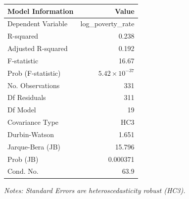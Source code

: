 \begin{table}[h]
\vspace{0.3cm}

\begin{tabular}{|l|r|}
\hline
\textbf{Model Information} & \textbf{Value} \\
\hline
Dependent Variable & log\_poverty\_rate \\
R-squared & 0.238 \\
Adjusted R-squared & 0.192 \\
F-statistic & 16.67 \\
Prob (F-statistic) & $5.42 \times 10^{-37}$ \\
No. Observations & 331 \\
Df Residuals & 311 \\
Df Model & 19 \\
Covariance Type & HC3 \\
Durbin-Watson & 1.651 \\
Jarque-Bera (JB) & 15.796 \\
Prob (JB) & 0.000371 \\
Cond. No. & 63.9 \\
\hline
\end{tabular}

\vspace{0.3cm}

\footnotesize
\textit{Notes: Standard Errors are heteroscedasticity robust (HC3).}

\end{table}


